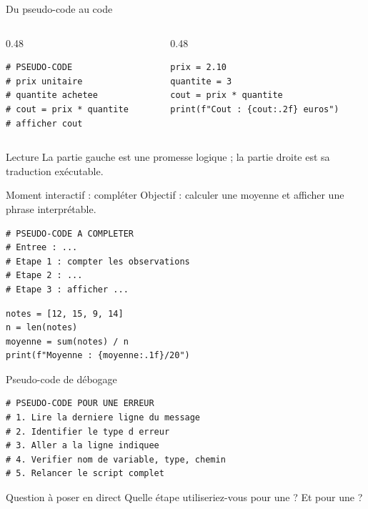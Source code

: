 \documentclass[10pt,aspectratio=169]{beamer}
\begin{document}
\begin{frame}[fragile]{Du pseudo-code au code}
\begin{columns}[T,totalwidth=\textwidth]
\begin{column}{0.48\textwidth}
\begin{lstlisting}
# PSEUDO-CODE
# prix unitaire
# quantite achetee
# cout = prix * quantite
# afficher cout
\end{lstlisting}
\end{column}
\begin{column}{0.48\textwidth}
\begin{lstlisting}
prix = 2.10
quantite = 3
cout = prix * quantite
print(f"Cout : {cout:.2f} euros")
\end{lstlisting}
\end{column}
\end{columns}
\vspace{0.3cm}
\begin{block}{Lecture}
La partie gauche est une promesse logique ; la partie droite est sa traduction exécutable.
\end{block}
\end{frame}

\begin{frame}[fragile]{Moment interactif : compléter}
Objectif : calculer une moyenne et afficher une phrase interprétable.
\begin{lstlisting}
# PSEUDO-CODE A COMPLETER
# Entree : ...
# Etape 1 : compter les observations
# Etape 2 : ...
# Etape 3 : afficher ...
\end{lstlisting}
\pause
\begin{lstlisting}
notes = [12, 15, 9, 14]
n = len(notes)
moyenne = sum(notes) / n
print(f"Moyenne : {moyenne:.1f}/20")
\end{lstlisting}
\end{frame}

\begin{frame}[fragile]{Pseudo-code de débogage}
\begin{lstlisting}
# PSEUDO-CODE POUR UNE ERREUR
# 1. Lire la derniere ligne du message
# 2. Identifier le type d erreur
# 3. Aller a la ligne indiquee
# 4. Verifier nom de variable, type, chemin
# 5. Relancer le script complet
\end{lstlisting}
\begin{block}{Question à poser en direct}
Quelle étape utiliseriez-vous pour une  ? Et pour une  ?
\end{block}
\end{frame}
\end{document}
